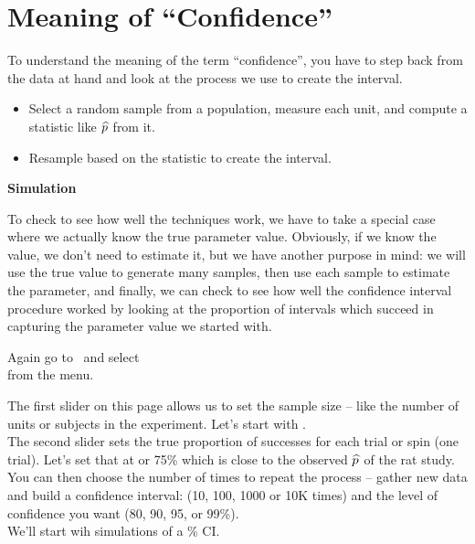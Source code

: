 
\def\theTopic{Confidence }
\def\dayNum{7}


\section{ Meaning of ``Confidence''}

To understand the meaning of the term ``confidence'', you have to step
back from the data at hand and look at the process we use to create
the interval.
\begin{itemize}
  \item Select a random sample from a population, measure each unit,
    and compute a  statistic like $\widehat{p}$ from it.
  \item Resample based on the statistic to create the interval.
  \end{itemize}

  \begin{center}
    {\large \bf Simulation}
  \end{center}

To check to see how well the techniques work, we have to take a
 special case where we actually know the true parameter value.
 Obviously, if we know the value, we don't need to estimate it, but we
 have another purpose in mind: we will use the true value to generate
 many samples, then use each sample to estimate the parameter, and
 finally, we can check to see how well the confidence interval
 procedure worked by looking at the proportion of intervals which
 succeed in capturing the parameter value we started with.

 Again go to \webAppURLFrst \ 
 and select \\
   from the  menu.
 
 The first slider on this page allows us to set the sample size --
 like the number of units or subjects in the experiment.  Let's start with
 \fbox{40}.\\
 The second slider sets the true proportion of successes for each
 trial or spin (one trial).  Let's set that at \fbox{0.75} or 75\%
 which is close to the observed $\widehat{p}$ of the rat study.\\
 You can then choose the number of times to repeat the process -- gather
 new data and build a confidence interval: (10, 100, 1000 or 10K
 times) and the level of confidence you want (80, 90, 95, or 99\%).\\
 We'll start wih \fbox{100} simulations of a \fbox{90}\% CI.

